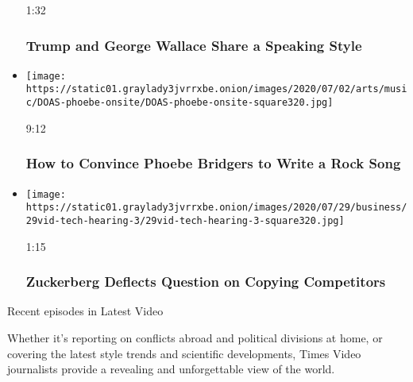 \begin{itemize}
  1:32

  \hypertarget{trump-and-george-wallace-share-a-speaking-style}{%
  \subsubsection{Trump and George Wallace Share a Speaking
  Style}\label{trump-and-george-wallace-share-a-speaking-style}}
\item
  \href{https://www.nytimes3xbfgragh.onion/video/arts/music/100000007258359/phoebe-bridgers-kyoto.html?action=click\&module=video-series-bar\&region=header\&pgtype=Article\&playlistId=video/latest-video}{}

  \texttt{[image: https://static01.graylady3jvrrxbe.onion/images/2020/07/02/arts/music/DOAS-phoebe-onsite/DOAS-phoebe-onsite-square320.jpg]}

  9:12

  \hypertarget{how-to-convince-phoebe-bridgers-to-write-a-rock-song}{%
  \subsubsection{How to Convince Phoebe Bridgers to Write a Rock
  Song}\label{how-to-convince-phoebe-bridgers-to-write-a-rock-song}}
\item
  \href{https://www.nytimes3xbfgragh.onion/video/us/politics/100000007263272/zuckerberg-jayapal-facebook.html?action=click\&module=video-series-bar\&region=header\&pgtype=Article\&playlistId=video/latest-video}{}

  \texttt{[image: https://static01.graylady3jvrrxbe.onion/images/2020/07/29/business/29vid-tech-hearing-3/29vid-tech-hearing-3-square320.jpg]}

  1:15

  \hypertarget{zuckerberg-deflects-question-on-copying-competitors}{%
  \subsubsection{Zuckerberg Deflects Question on Copying
  Competitors}\label{zuckerberg-deflects-question-on-copying-competitors}}
\end{itemize}

Recent episodes in Latest Video

Whether it's reporting on conflicts abroad and political divisions at
home, or covering the latest style trends and scientific developments,
Times Video journalists provide a revealing and unforgettable view of
the world.

